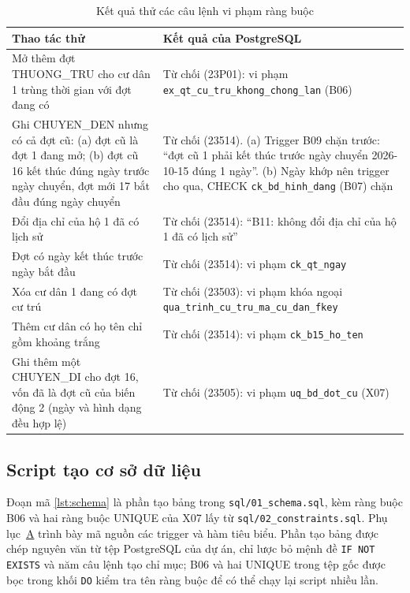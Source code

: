 \begin{table}[H]
\centering
\fontsize{12pt}{16pt}\selectfont
\renewcommand{\arraystretch}{1.15}
\begin{tabularx}{\textwidth}{|Y|P{6.4cm}|}
\hline
\textbf{Thao tác thử} & \textbf{Kết quả của PostgreSQL} \\
\hline
Mở thêm đợt THUONG\_TRU cho cư dân 1 trùng thời gian với đợt đang có & Từ chối (23P01): vi phạm \texttt{ex\_qt\_cu\_tru\_khong\_chong\_lan} (B06) \\
\hline
Ghi CHUYEN\_DEN nhưng có cả đợt cũ: (a) đợt cũ là đợt 1 đang mở; (b) đợt cũ 16 kết thúc đúng ngày trước ngày chuyển, đợt mới 17 bắt đầu đúng ngày chuyển & Từ chối (23514). (a) Trigger B09 chặn trước: ``đợt cũ 1 phải kết thúc trước ngày chuyển 2026-10-15 đúng 1 ngày''. (b) Ngày khớp nên trigger cho qua, CHECK \texttt{ck\_bd\_hinh\_dang} (B07) chặn \\
\hline
Đổi địa chỉ của hộ 1 đã có lịch sử & Từ chối (23514): ``B11: không đổi địa chỉ của hộ 1 đã có lịch sử'' \\
\hline
Đợt có ngày kết thúc trước ngày bắt đầu & Từ chối (23514): vi phạm \texttt{ck\_qt\_ngay} \\
\hline
Xóa cư dân 1 đang có đợt cư trú & Từ chối (23503): vi phạm khóa ngoại \texttt{qua\_trinh\_cu\_tru\_ma\_cu\_dan\_fkey} \\
\hline
Thêm cư dân có họ tên chỉ gồm khoảng trắng & Từ chối (23514): vi phạm \texttt{ck\_b15\_ho\_ten} \\
\hline
Ghi thêm một CHUYEN\_DI cho đợt 16, vốn đã là đợt cũ của biến động 2 (ngày và hình dạng đều hợp lệ) & Từ chối (23505): vi phạm \texttt{uq\_bd\_dot\_cu} (X07) \\
\hline
\end{tabularx}
\caption{Kết quả thử các câu lệnh vi phạm ràng buộc}
\label{tab:thurangbuoc}
\end{table}

\subsection{Script tạo cơ sở dữ liệu}
\label{subsec:script}

{\sloppy Đoạn mã \ref{lst:schema} là phần tạo bảng trong \texttt{sql/01\_schema.sql}, kèm ràng buộc B06 và hai ràng buộc UNIQUE của X07 lấy từ \texttt{sql/02\_constraints.sql}. Phụ lục~\hyperref[sec:phuluc]{A} trình bày mã nguồn các trigger và hàm tiêu biểu. Phần tạo bảng được chép nguyên văn từ tệp PostgreSQL của dự án, chỉ lược bỏ mệnh đề \texttt{IF NOT EXISTS} và năm câu lệnh tạo chỉ mục; B06 và hai UNIQUE trong tệp gốc được bọc trong khối \texttt{DO} kiểm tra tên ràng buộc để có thể chạy lại script nhiều lần.\par}

